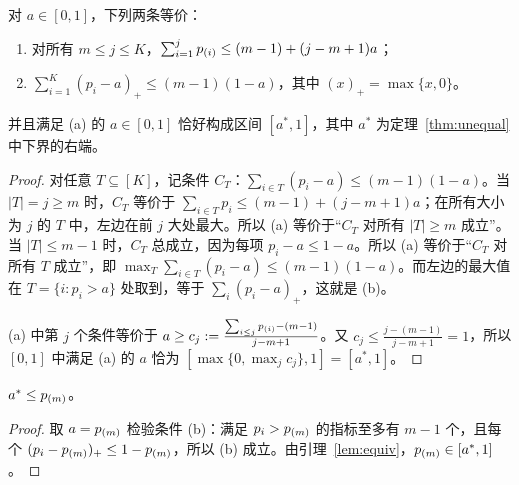 \documentclass[11pt]{article}
\begin{document}
\begin{lemma}[下界条件的等价形式]\label{lem:equiv}
对 $a\in[0,1]$，下列两条等价：
\begin{enumerate}[label=(\alph*)]
\item 对所有 $m\le j\le K$，$\sum_{i=1}^{j}p_{(i)}\le(m-1)+(j-m+1)a$；
\item $\sum_{i=1}^K(p_i-a)_+\le(m-1)(1-a)$，其中 $(x)_+=\max\{x,0\}$。
\end{enumerate}
并且满足 (a) 的 $a\in[0,1]$ 恰好构成区间 $[a^\ast,1]$，其中 $a^\ast$ 为定理~\ref{thm:unequal} 中下界的右端。
\end{lemma}
\begin{proof}
对任意 $T\subseteq[K]$，记条件 $C_T$：$\sum_{i\in T}(p_i-a)\le(m-1)(1-a)$。当 $|T|=j\ge m$ 时，$C_T$ 等价于 $\sum_{i\in T}p_i\le(m-1)+(j-m+1)a$；在所有大小为 $j$ 的 $T$ 中，左边在前 $j$ 大处最大。所以 (a) 等价于“$C_T$ 对所有 $|T|\ge m$ 成立”。当 $|T|\le m-1$ 时，$C_T$ 总成立，因为每项 $p_i-a\le1-a$。所以 (a) 等价于“$C_T$ 对所有 $T$ 成立”，即 $\max_T\sum_{i\in T}(p_i-a)\le(m-1)(1-a)$。而左边的最大值在 $T=\{i:p_i>a\}$ 处取到，等于 $\sum_i(p_i-a)_+$，这就是 (b)。

(a) 中第 $j$ 个条件等价于 $a\ge c_j:=\frac{\sum_{i\le j}p_{(i)}-(m-1)}{j-m+1}$。又 $c_j\le\frac{j-(m-1)}{j-m+1}=1$，所以 $[0,1]$ 中满足 (a) 的 $a$ 恰为 $[\max\{0,\max_jc_j\},1]=[a^\ast,1]$。
\end{proof}

\begin{lemma}\label{lem:apm}
$a^\ast\le p_{(m)}$。
\end{lemma}
\begin{proof}
取 $a=p_{(m)}$ 检验条件 (b)：满足 $p_i>p_{(m)}$ 的指标至多有 $m-1$ 个，且每个 $(p_i-p_{(m)})_+\le1-p_{(m)}$，所以 (b) 成立。由引理~\ref{lem:equiv}，$p_{(m)}\in[a^\ast,1]$。
\end{proof}
\end{document}

